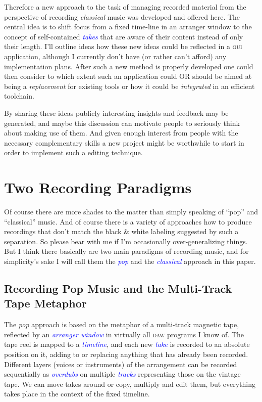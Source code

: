 \documentclass[11pt,a4paper]{article}
\newcommand*{\term}[1]{\textcolor{blue}{\emph{#1}}}
\begin{document}
Therefore a new approach to the task of managing
recorded material from the perspective of recording \emph{classical} music was developed and offered here.
The central idea is to shift focus from a fixed time-line in an arranger
window to the concept of self-contained \term{takes} that are aware of their
content instead of only their length.
I'll outline ideas how these new ideas could be reflected in a \textsc{gui}
application, although I currently don't have (or rather can't afford) any
implementation plans.
After such a new method is properly developed one could then consider to which extent such an
application could OR should be aimed at being a \emph{replacement} for existing
tools or how it could be \emph{integrated} in an efficient toolchain.

By sharing these ideas publicly interesting insights and
feedback may be generated, and maybe this discussion can motivate people to seriously think about
making use of them.
And given enough interest from people with the necessary complementary skills a new project might be worthwhile to start in order to implement such a editing technique.

\section{Two Recording Paradigms}

Of course there are more shades to the matter  than simply speaking of “pop” and
“classical” music.
And of course there is a variety of approaches how to produce recordings that
don't match the black \& white labeling suggested by such a separation.
So please bear with me if I'm occasionally over-generalizing things.
But I think there basically are two main paradigms of recording music, and for
simplicity's sake I will call them the \term{pop} and the \term{classical}
approach in this paper.

\subsection{Recording Pop Music and the Multi-Track Tape Metaphor}

The \emph{pop} approach is based on the metaphor of a multi-track magnetic tape,
reflected by an \term{arranger window} in virtually all \textsc{daw} programs I
know of.
The tape reel is mapped to a \term{timeline}, and each new \term{take} is recorded to
an absolute position on it, adding to or replacing anything that has already
been recorded.
Different layers (voices or instruments) of the arrangement can be recorded
sequentially as \term{overdubs} on multiple \term{tracks} representing those on the
vintage tape.
We can move takes around or copy, multiply and edit them, but everything takes
place in the context of the fixed timeline.
\end{document}
